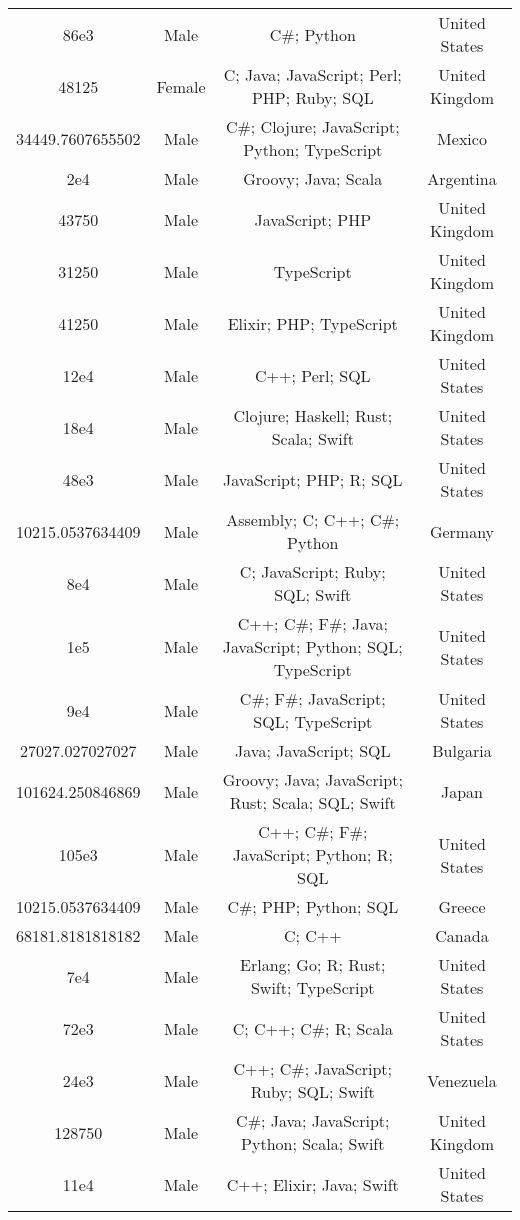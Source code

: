 \begin{center}
\begin{tabular}{ |c|c|c|c| }
86e3  &  Male  &  C\#; Python  &  United States  \\ 
48125  &  Female  &  C; Java; JavaScript; Perl; PHP; Ruby; SQL  &  United Kingdom  \\ 
34449.7607655502  &  Male  &  C\#; Clojure; JavaScript; Python; TypeScript  &  Mexico  \\ 
2e4  &  Male  &  Groovy; Java; Scala  &  Argentina  \\ 
43750  &  Male  &  JavaScript; PHP  &  United Kingdom  \\ 
31250  &  Male  &  TypeScript  &  United Kingdom  \\ 
41250  &  Male  &  Elixir; PHP; TypeScript  &  United Kingdom  \\ 
12e4  &  Male  &  C++; Perl; SQL  &  United States  \\ 
18e4  &  Male  &  Clojure; Haskell; Rust; Scala; Swift  &  United States  \\ 
48e3  &  Male  &  JavaScript; PHP; R; SQL  &  United States  \\ 
10215.0537634409  &  Male  &  Assembly; C; C++; C\#; Python  &  Germany  \\ 
8e4  &  Male  &  C; JavaScript; Ruby; SQL; Swift  &  United States  \\ 
1e5  &  Male  &  C++; C\#; F\#; Java; JavaScript; Python; SQL; TypeScript  &  United States  \\ 
9e4  &  Male  &  C\#; F\#; JavaScript; SQL; TypeScript  &  United States  \\ 
27027.027027027  &  Male  &  Java; JavaScript; SQL  &  Bulgaria  \\ 
101624.250846869  &  Male  &  Groovy; Java; JavaScript; Rust; Scala; SQL; Swift  &  Japan  \\ 
105e3  &  Male  &  C++; C\#; F\#; JavaScript; Python; R; SQL  &  United States  \\ 
10215.0537634409  &  Male  &  C\#; PHP; Python; SQL  &  Greece  \\ 
68181.8181818182  &  Male  &  C; C++  &  Canada  \\ 
7e4  &  Male  &  Erlang; Go; R; Rust; Swift; TypeScript  &  United States  \\ 
72e3  &  Male  &  C; C++; C\#; R; Scala  &  United States  \\ 
24e3  &  Male  &  C++; C\#; JavaScript; Ruby; SQL; Swift  &  Venezuela  \\ 
128750  &  Male  &  C\#; Java; JavaScript; Python; Scala; Swift  &  United Kingdom  \\ 
11e4  &  Male  &  C++; Elixir; Java; Swift  &  United States  \\ 

\end{tabular}
\end{center}
